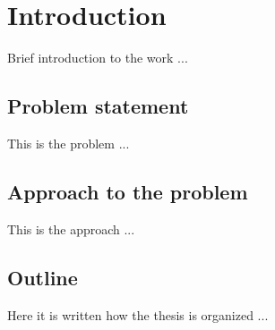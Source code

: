 \chapter{Introduction}
\label{cha:intro}
\vspace{0.4 cm}

Brief introduction to the work ...

\section{Problem statement}
\label{sec:problem}
\vspace{0.2 cm}

This is the problem ...


\section{Approach to the problem} 
\label{sec:approach}
\vspace{0.2 cm}

This is the approach ...


\section{Outline} 
\label{sec:outline}
\vspace{0.2 cm}

Here it is written how the thesis is organized ...
